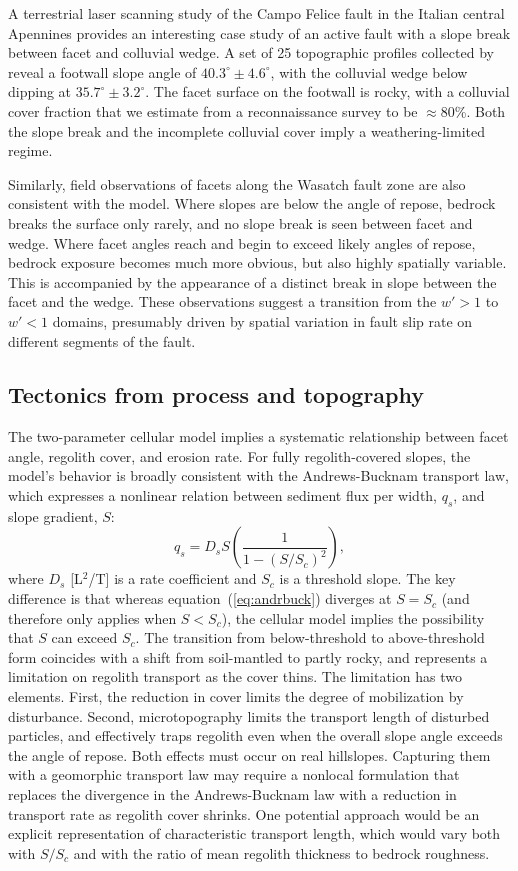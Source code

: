 A terrestrial laser scanning study of the Campo Felice fault in the Italian central Apennines provides an interesting case study of an active fault with a slope break between facet and colluvial wedge. A set of 25 topographic profiles collected by \citet{wilkinson2015slip} reveal a footwall slope angle of $40.3^\circ\pm 4.6^\circ$, with the colluvial wedge below dipping at $35.7^\circ\pm3.2^\circ$. The facet surface on the footwall is rocky, with a colluvial cover fraction that we estimate from a reconnaissance survey to be $\approx 80$\%. Both the slope break and the incomplete colluvial cover imply a weathering-limited regime. 

Similarly, field observations of facets along the Wasatch fault zone are also consistent with the model. Where slopes are below the angle of repose, bedrock breaks the surface only rarely, and no slope break is seen between facet and wedge. Where facet angles reach and begin to exceed likely angles of repose, bedrock exposure becomes much more obvious, but also highly spatially variable. This is accompanied by the appearance of a distinct break in slope between the facet and the wedge. These observations suggest a transition from the $w' > 1$ to $w' < 1$ domains, presumably driven by spatial variation in fault slip rate on different segments of the fault.

\subsection{Tectonics from process and topography}

The two-parameter cellular model implies a systematic relationship between facet angle, regolith cover, and erosion rate. For fully regolith-covered slopes, the model's behavior is broadly consistent with the Andrews-Bucknam transport law, which expresses a nonlinear relation between sediment flux per width, $q_s$, and slope gradient, $S$:
\begin{equation}
q_s = D_s S \left( \frac{1}{1-(S/S_c)^2} \right),
\label{eq:andrbuck}
\end{equation}
where $D_s$ [L$^2$/T] is a rate coefficient and $S_c$ is a threshold slope. The key difference is that whereas equation~(\ref{eq:andrbuck}) diverges at $S=S_c$ (and therefore only applies when $S<S_c$), the cellular model implies the possibility that $S$ can exceed $S_c$. The transition from below-threshold to above-threshold form coincides with a shift from soil-mantled to partly rocky, and represents a limitation on regolith transport as the cover thins. The limitation has two elements. First, the reduction in cover limits the degree of mobilization by disturbance. Second, microtopography limits the transport length of disturbed particles, and effectively traps regolith even when the overall slope angle exceeds the angle of repose. Both effects must occur on real hillslopes. Capturing them with a geomorphic transport law may require a nonlocal formulation that replaces the divergence in the Andrews-Bucknam law with a reduction in transport rate as regolith cover shrinks. One potential approach would be an explicit representation of characteristic transport length, which would vary both with $S/S_c$ and with the ratio of mean regolith thickness to bedrock roughness.

